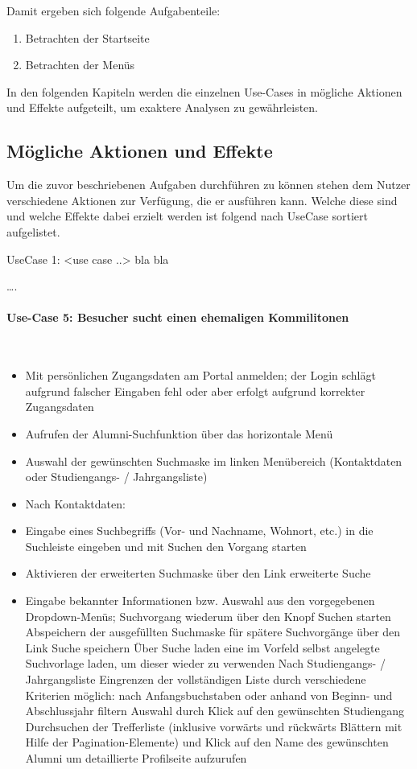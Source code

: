 Damit ergeben sich folgende Aufgabenteile:
\begin{enumerate}
	\item Betrachten der Startseite
	\item Betrachten der Menüs
\end{enumerate}


In den folgenden Kapiteln werden die einzelnen Use-Cases in mögliche Aktionen und Effekte aufgeteilt, um exaktere Analysen zu gewährleisten.

\subsection{Mögliche Aktionen und Effekte}
Um die zuvor beschriebenen Aufgaben durchführen zu können stehen dem Nutzer verschiedene Aktionen zur Verfügung, die er ausführen kann. Welche diese sind und welche Effekte dabei erzielt werden ist folgend nach UseCase sortiert aufgelistet.

UseCase 1: <use case ..>
bla bla

….

\paragraph{Use-Case 5: Besucher sucht einen ehemaligen Kommilitonen}\quad \\
\begin{itemize}

\item Mit persönlichen Zugangsdaten am Portal anmelden; der Login schlägt aufgrund falscher Eingaben fehl oder aber erfolgt aufgrund korrekter Zugangsdaten
\item Aufrufen der Alumni-Suchfunktion über das horizontale Menü
\item Auswahl der gewünschten Suchmaske im linken Menübereich (Kontaktdaten oder Studiengangs- / Jahrgangsliste)
\item Nach Kontaktdaten:
\item Eingabe eines Suchbegriffs (Vor- und Nachname, Wohnort, etc.) in die Suchleiste eingeben und mit Suchen den Vorgang starten
\item Aktivieren der erweiterten Suchmaske über den Link erweiterte Suche
\item Eingabe bekannter Informationen bzw. Auswahl aus den vorgegebenen Dropdown-Menüs; Suchvorgang wiederum über den Knopf Suchen starten
Abspeichern der ausgefüllten Suchmaske für spätere Suchvorgänge über den Link Suche speichern
Über Suche laden eine im Vorfeld selbst angelegte Suchvorlage laden, um dieser wieder zu verwenden
Nach Studiengangs- / Jahrgangsliste
Eingrenzen der vollständigen Liste durch verschiedene Kriterien möglich: nach Anfangsbuchstaben oder anhand von Beginn- und Abschlussjahr filtern
Auswahl durch Klick auf den gewünschten Studiengang
Durchsuchen der Trefferliste (inklusive vorwärts und rückwärts Blättern mit Hilfe der Pagination-Elemente) und Klick auf den Name des gewünschten Alumni um detaillierte Profilseite aufzurufen
\end{itemize}